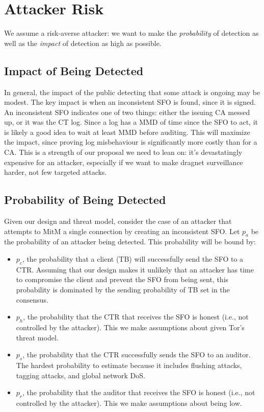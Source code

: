 \section{Attacker Risk} \label{sec:risk}
We assume a risk-averse attacker: we want to make the \emph{probability} of
detection as well as the \emph{impact} of detection as high as possible.

\subsection{Impact of Being Detected}


In general, the impact of the public detecting that some attack is ongoing may
be modest. The key impact is when an inconsistent SFO is found, since it is
signed. An inconsistent SFO indicates one of two things: either the issuing CA
messed up, or it was the CT log. Since a log has a MMD of time since the SFO to
act, it is likely a good idea to wait at least MMD before auditing. This will
maximize the impact, since proving log misbehaviour is significantly more costly
than for a CA. This is a strength of our proposal we need to lean on: it's
devastatingly expensive for an attacker, especially if we want to make dragnet
surveillance harder, not few targeted attacks.

\subsection{Probability of Being Detected}
Given our design and threat model, consider the case of an attacker that
attempts to MitM a single connection by creating an inconsistent SFO. Let $p_a$
be the probability of an attacker being detected. This probability will be bound
by:

\begin{itemize}
    \item $p_c$, the probability that a client (TB) will successfully send the
    SFO to a CTR. Assuming that our design makes it unlikely that an attacker
    has time to compromise the client and prevent the SFO from being sent, this
    probability is dominated by the sending probability of TB set in the
    consensus.
    \item $p_h$, the probability that the CTR that receives the SFO is honest
    (i.e., not controlled by the attacker). This we make assumptions about given
    Tor's threat model.
    \item $p_s$, the probability that the CTR successfully sends the SFO to an
    auditor. The hardest probability to estimate because it includes flushing
    attacks, tagging attacks, and global network DoS.
    \item $p_r$, the probability that the auditor that receives the SFO is
    honest (i.e., not controlled by the attacker). This we make assumptions
    about being low.
\end{itemize}

